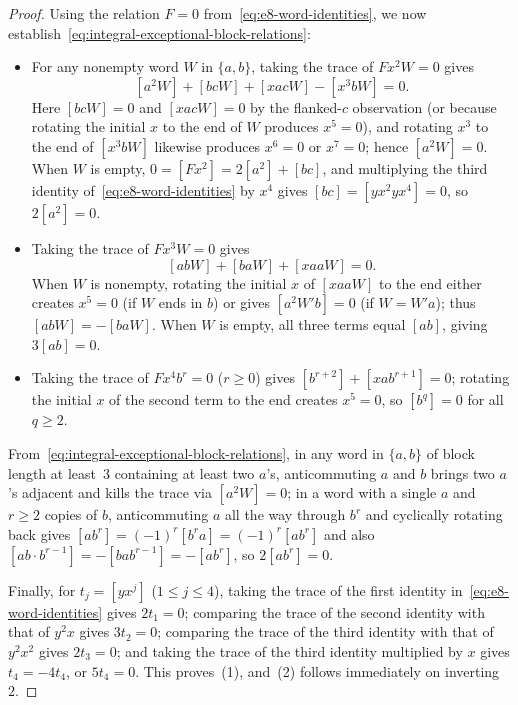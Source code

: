 \begin{proof}
Using the relation $F=0$ from~\eqref{eq:e8-word-identities}, we now establish~\eqref{eq:integral-exceptional-block-relations}:
\begin{itemize}
\item For any nonempty word $W$ in $\{a,b\}$, taking the trace of $Fx^2W=0$ gives
\[
  [a^2W]+[bcW]+[xacW]-[x^3bW]=0.
\]
Here $[bcW]=0$ and $[xacW]=0$ by the flanked-$c$ observation (or because rotating the initial $x$ to the end of $W$ produces $x^5=0$), and rotating $x^3$ to the end of $[x^3bW]$ likewise produces $x^6=0$ or $x^7=0$; hence $[a^2W]=0$. When $W$ is empty, $0=[Fx^2]=2[a^2]+[bc]$, and multiplying the third identity of~\eqref{eq:e8-word-identities} by $x^4$ gives $[bc]=[yx^2yx^4]=0$, so $2[a^2]=0$.
\item Taking the trace of $Fx^3W=0$ gives
\[
  [abW]+[baW]+[xaaW]=0.
\]
When $W$ is nonempty, rotating the initial $x$ of $[xaaW]$ to the end either creates $x^5=0$ (if $W$ ends in $b$) or gives $[a^2W'b]=0$ (if $W=W'a$); thus $[abW]=-[baW]$. When $W$ is empty, all three terms equal $[ab]$, giving $3[ab]=0$.
\item Taking the trace of $Fx^4b^r=0$ ($r\geq0$) gives $[b^{r+2}]+[xab^{r+1}]=0$; rotating the initial $x$ of the second term to the end creates $x^5=0$, so $[b^q]=0$ for all $q\geq2$.
\end{itemize}
From~\eqref{eq:integral-exceptional-block-relations}, in any word in $\{a,b\}$ of block length at least~$3$ containing at least two $a$'s, anticommuting $a$ and $b$ brings two $a$'s adjacent and kills the trace via $[a^2W]=0$; in a word with a single $a$ and $r\geq2$ copies of $b$, anticommuting $a$ all the way through $b^r$ and cyclically rotating back gives $[ab^r]=(-1)^r[b^ra]=(-1)^r[ab^r]$ and also $[ab\cdot b^{r-1}]=-[bab^{r-1}]=-[ab^r]$, so $2[ab^r]=0$.

Finally, for $t_j=[yx^j]$ ($1\leq j\leq4$), taking the trace of the first identity in~\eqref{eq:e8-word-identities} gives $2t_1=0$; comparing the trace of the second identity with that of $y^2x$ gives $3t_2=0$; comparing the trace of the third identity with that of $y^2x^2$ gives $2t_3=0$; and taking the trace of the third identity multiplied by $x$ gives $t_4=-4t_4$, or $5t_4=0$. This proves~(1), and~(2) follows immediately on inverting~$2$.
\end{proof}

